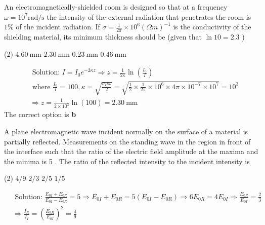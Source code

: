 \begin{enumerate}
\begin{minipage}{\textwidth}
	\item An electromagnetically-shielded room is designed so that at a frequency $\omega=10^{7} \mathrm{rad} / \mathrm{s}$ the intensity of the external radiation that penetrates the room is $1 \%$ of the incident radiation. If $\sigma=\frac{1}{2 \pi} \times 10^{6}(\Omega m)^{-1}$ is the conductivity of the shielding material, its minimum thickness should be (given that $\ln 10=2.3$ )
\end{minipage}
\begin{tasks}(2)
	\task[\textbf{A.}] $4.60 \mathrm{~mm}$
	\task[\textbf{B.}]$2.30 \mathrm{~mm}$
	\task[\textbf{C.}] $0.23 \mathrm{~mm}$
	\task[\textbf{D.}]$0.46 \mathrm{~mm}$
\end{tasks}
\begin{answer}
	$$\begin{aligned}
	&\text { Solution: } I=I_{0} e^{-2 \kappa z} \Rightarrow z=\frac{1}{2 \kappa} \ln \left(\frac{I_{0}}{I}\right) \\
	&\text { where } \frac{I_{0}}{I}=100, \kappa=\sqrt{\frac{\sigma \mu \omega}{2}}=\sqrt{\frac{1}{2} \times \frac{1}{2 \pi} \times 10^{6} \times 4 \pi \times 10^{-7} \times 10^{7}}=10^{3} \\
	&\Rightarrow z=\frac{1}{2 \times 10^{3}} \ln (100)=2.30 \mathrm{~mm}
	\end{aligned}$$
	The correct option is \textbf{b}	
\end{answer}
\begin{minipage}{\textwidth}
	\item A plane electromagnetic wave incident normally on the surface of a material is partially reflected. Measurements on the standing wave in the region in front of the interface such that the ratio of the electric field amplitude at the maxima and the minima is 5 . The ratio of the reflected intensity to the incident intensity is
\end{minipage}
\begin{tasks}(2)
	\task[\textbf{A.}] $4 / 9$
	\task[\textbf{B.}] $2 / 3$
	\task[\textbf{C.}]$2 / 5$
	\task[\textbf{D.}]$1 / 5$
\end{tasks}
\begin{answer}
	$$\begin{aligned}
	&\text { Solution: } \frac{E_{0 I}+E_{0 R}}{E_{0 I}-E_{0 R}}=5 \Rightarrow E_{0 I}+E_{0 R}=5\left(E_{0 I}-E_{0 R}\right) \Rightarrow 6 E_{0 R}=4 E_{0 I} \Rightarrow \frac{E_{0 R}}{E_{0 I}}=\frac{2}{3} \\
	&\Rightarrow \frac{I_{R}}{I_{I}}=\left(\frac{E_{0 R}}{E_{0 I}}\right)^{2}=\frac{4}{9}

\end{aligned}$$
\end{answer}
\end{enumerate}
